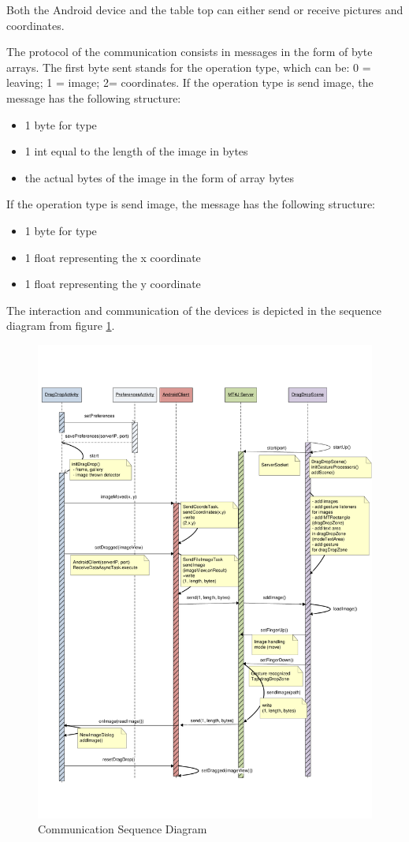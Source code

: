 Both the Android device and the table top can either send or
receive pictures and coordinates.

The protocol of the communication consists in messages in the form of byte
arrays. The first byte sent stands for the operation type, which can be:       
0 = leaving; 1 = image; 2= coordinates. 
If the operation type is send image, the message has the following
structure:
\begin{itemize}
  \item 1 byte for type
  \item 1 int equal to the length of the image in bytes
  \item the actual bytes of the image in the form of array bytes
\end{itemize}
If the operation type is send image, the message has the following
structure:
\begin{itemize}
  \item 1 byte for type
  \item 1 float representing the x coordinate
  \item 1 float representing the y coordinate
\end{itemize}

The interaction and communication of the devices is depicted in the sequence
diagram from figure \ref{fig.sequence_diagram}.

 \begin{figure}[H]
    \begin{center}
        \includegraphics[width=\textwidth]{fig/sequence_diagram.pdf}
        \caption{Communication Sequence Diagram }
        \label{fig.sequence_diagram}
    \end{center}
\end{figure}
